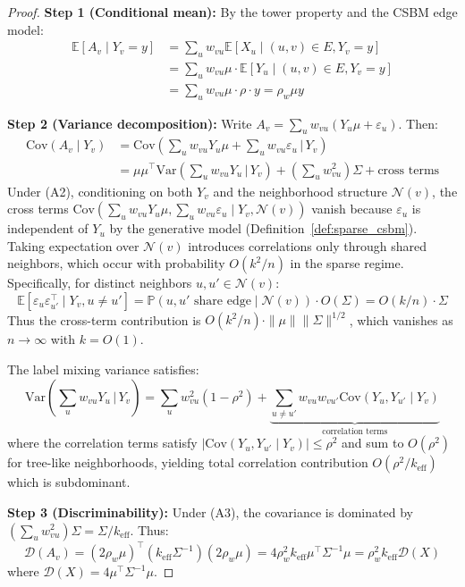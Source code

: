 \begin{proof}
\textbf{Step 1 (Conditional mean):}
By the tower property and the CSBM edge model:
\begin{align}
    \mathbb{E}[A_v \mid Y_v = y] &= \sum_u w_{vu} \mathbb{E}[X_u \mid (u,v) \in E, Y_v = y] \\
    &= \sum_u w_{vu} \mu \cdot \mathbb{E}[Y_u \mid (u,v) \in E, Y_v = y] \\
    &= \sum_u w_{vu} \mu \cdot \rho \cdot y = \rho_w \mu y
\end{align}

\textbf{Step 2 (Variance decomposition):}
Write $A_v = \sum_u w_{vu} (Y_u \mu + \varepsilon_u)$. Then:
\begin{align}
    \mathrm{Cov}(A_v \mid Y_v) &= \mathrm{Cov}\left(\sum_u w_{vu} Y_u \mu + \sum_u w_{vu} \varepsilon_u \,\Big|\, Y_v\right) \\
    &= \mu \mu^\top \mathrm{Var}\left(\sum_u w_{vu} Y_u \,\Big|\, Y_v\right) + \left(\sum_u w_{vu}^2\right) \Sigma + \text{cross terms}
\end{align}
Under (A2), conditioning on both $Y_v$ and the neighborhood structure $\mathcal{N}(v)$, the cross terms $\mathrm{Cov}(\sum_u w_{vu} Y_u \mu, \sum_u w_{vu} \varepsilon_u \mid Y_v, \mathcal{N}(v))$ vanish because $\varepsilon_u$ is independent of $Y_u$ by the generative model (Definition~\ref{def:sparse_csbm}). Taking expectation over $\mathcal{N}(v)$ introduces correlations only through shared neighbors, which occur with probability $O(k^2/n)$ in the sparse regime. Specifically, for distinct neighbors $u, u' \in \mathcal{N}(v)$:
\begin{equation}
    \mathbb{E}[\varepsilon_u \varepsilon_{u'}^\top \mid Y_v, u \neq u'] = \mathbb{P}(u, u' \text{ share edge} \mid \mathcal{N}(v)) \cdot O(\Sigma) = O(k/n) \cdot \Sigma
\end{equation}
Thus the cross-term contribution is $O(k^2/n) \cdot \|\mu\| \|\Sigma\|^{1/2}$, which vanishes as $n \to \infty$ with $k = O(1)$.

The label mixing variance satisfies:
\begin{equation}
    \mathrm{Var}\left(\sum_u w_{vu} Y_u \,\Big|\, Y_v\right) = \sum_u w_{vu}^2 (1 - \rho^2) + \underbrace{\sum_{u \neq u'} w_{vu} w_{vu'} \mathrm{Cov}(Y_u, Y_{u'} \mid Y_v)}_{\text{correlation terms}}
\end{equation}
where the correlation terms satisfy $|\mathrm{Cov}(Y_u, Y_{u'} \mid Y_v)| \leq \rho^2$ and sum to $O(\rho^2)$ for tree-like neighborhoods, yielding total correlation contribution $O(\rho^2/k_{\mathrm{eff}})$ which is subdominant.

\textbf{Step 3 (Discriminability):}
Under (A3), the covariance is dominated by $(\sum_u w_{vu}^2) \Sigma = \Sigma / k_{\mathrm{eff}}$. Thus:
\begin{equation}
    \mathcal{D}(A_v) = (2\rho_w \mu)^\top (k_{\mathrm{eff}} \Sigma^{-1}) (2\rho_w \mu) = 4\rho_w^2 k_{\mathrm{eff}} \mu^\top \Sigma^{-1} \mu = \rho_w^2 k_{\mathrm{eff}} \mathcal{D}(X)
\end{equation}
where $\mathcal{D}(X) = 4\mu^\top \Sigma^{-1} \mu$.
\end{proof}

